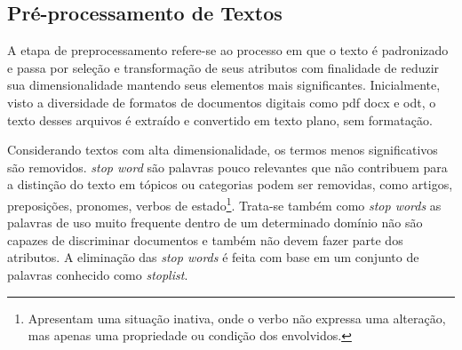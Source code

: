 \subsection{Pré-processamento de Textos}











A etapa de preprocessamento refere-se ao processo em que o texto é padronizado e passa por seleção e transformação de seus atributos com finalidade de reduzir sua dimensionalidade mantendo seus elementos mais significantes.
Inicialmente, visto a diversidade de formatos de documentos digitais como pdf docx e odt, o texto desses arquivos é extraído e convertido em texto plano, sem formatação.

Considerando textos com alta dimensionalidade, os termos menos significativos são removidos.
\textit{stop word} são palavras pouco relevantes que não contribuem para a distinção do texto em tópicos ou categorias podem ser removidas, como artigos, preposições, pronomes, verbos de estado\footnote{Apresentam uma situação inativa, onde o verbo não expressa uma alteração, mas apenas uma propriedade ou condição dos envolvidos.}. Trata-se também como \textit{stop words} as palavras de uso muito frequente dentro de um determinado domínio não são capazes de discriminar documentos e também não devem fazer parte dos atributos. A eliminação das \textit{stop words} é feita com base em um conjunto de palavras conhecido como \textit{stoplist}.

